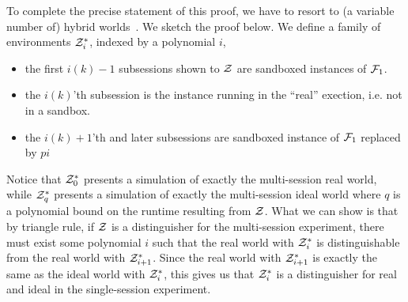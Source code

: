 To complete the precise statement of this proof, we have to resort to (a variable number of) hybrid worlds~\cite{canettiUC,variablehybrids}. We sketch the proof below.
We define a family of environments $\mathcal{Z}^*_i$, indexed by a polynomial $i$,
\begin{itemize}
\item the first $i(k)-1$ subsessions shown to $\mathcal{Z}$ are sandboxed instances of $\mathcal{F}_1$.
\item the $i(k)$'th subsession is the instance running in the ``real'' exection, i.e. not in a sandbox. 
\item the $i(k)+1$'th and later subsessions are sandboxed instance of $\mathcal{F}_1$ replaced by $pi$
\end{itemize}
Notice that $\mathcal{Z}^*_0$ presents a simulation of exactly the multi-session real world, while $\mathcal{Z}^*_q$ presents a simulation of exactly the multi-session ideal world where $q$ is a polynomial bound on the runtime resulting from $\mathcal{Z}$.
What we can show is that by triangle rule, if $\mathcal{Z}$ is a distinguisher for the multi-session experiment, there must exist some polynomial $i$ such that the real world with $\mathcal{Z}^*_i$ is distinguishable from the real world with $\mathcal{Z}^*_{i+1}$. Since the real world with $\mathcal{Z}^*_{i+1}$ is exactly the same as the ideal world with $\mathcal{Z}^*_i$, this gives us that $\mathcal{Z}^*_i$ is a distinguisher for real and ideal in the single-session experiment.

